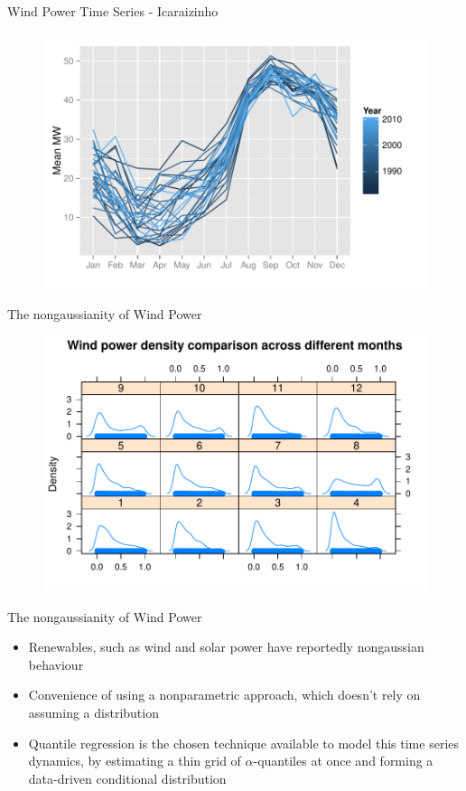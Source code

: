 \begin{frame}{Wind Power Time Series - Icaraizinho}

\begin{figure}
    \centering
    \includegraphics[width=0.9\linewidth]{Imagens/icaraizinho-mensal}
\end{figure}

\end{frame}

\begin{frame}{The nongaussianity of Wind Power}

\begin{figure}
    \centering
    \includegraphics[width=0.9\linewidth]{Imagens/density}
\end{figure}

\end{frame}

\begin{frame}{The nongaussianity of Wind Power}

\begin{itemize}
\tightlist
\item
  Renewables, such as wind and solar power have reportedly nongaussian
  behaviour
\item
  Convenience of using a nonparametric approach, which doesn't rely on
  assuming a distribution
\item
  Quantile regression is the chosen technique available to model this
  time series dynamics, by estimating a thin grid of
  \(\alpha\)-quantiles at once and forming a data-driven conditional
  distribution
\end{itemize}

\end{frame}

